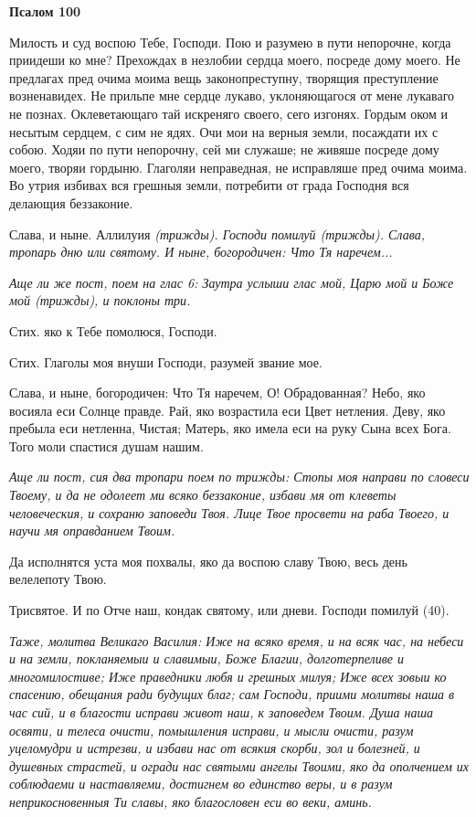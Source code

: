 \bfseries Псалом 100\normalfont{}


Милость и суд воспою Тебе, Господи. Пою и разумею в пути непорочне, когда приидеши ко мне? Прехождах в незлобии сердца моего, посреде дому моего. Не предлагах пред очима моима вещь законопреступну, творящия преступление возненавидех. Не прильпе мне сердце лукаво, уклоняющагося от мене лукаваго не познах. Оклеветающаго тай искреняго своего, сего изгонях. Гордым оком и несытым сердцем, с сим не ядях. Очи мои на верныя земли, посаждати их с собою. Ходяи по пути непорочну, сей ми служаше; не живяше посреде дому моего, творяи гордыню. Глаголяи неправедная, не исправляше пред очима моима. Во утрия избивах вся грешныя земли, потребити от града Господня вся делающия беззаконие.


Слава, и ныне. Аллилуия \itshape (трижды)\normalfont{}. Господи помилуй \itshape (трижды)\normalfont{}. Слава, тропарь дню или святому. И ныне, богородичен: Что Тя наречем...


\itshape Аще ли же пост, поем на глас 6:\normalfont{} Заутра услыши глас мой, Царю мой и Боже мой \itshape (трижды)\normalfont{}, и поклоны три.


Стих. яко к Тебе помолюся, Господи.


Стих. Глаголы моя внуши Господи, разумей звание мое.


Слава, и ныне, богородичен: Что Тя наречем, О! Обрадованная? Небо, яко восияла еси Солнце правде. Рай, яко возрастила еси Цвет нетления. Деву, яко пребыла еси нетленна, Чистая; Матерь, яко имела еси на руку Сына всех Бога. Того моли спастися душам нашим.


\itshape Аще ли пост, сия два тропари поем по трижды:\normalfont{} Стопы моя направи по словеси Твоему, и да не одолеет ми всяко беззаконие, избави мя от клеветы человеческия, и сохраню заповеди Твоя. Лице Твое просвети на раба Твоего, и научи мя оправданием Твоим.


Да исполнятся уста моя похвалы, яко да воспою славу Твою, весь день велелепоту Твою.


Трисвятое. И по Отче наш, кондак святому, или дневи. Господи помилуй (40).


\itshape Таже, молитва Великаго Василия:\normalfont{} Иже на всяко время, и на всяк час, на небеси и на земли, покланяемыи и славимыи, Боже Благии, долготерпеливе и многомилостиве; Иже праведники любя и грешных милуя; Иже всех зовыи ко спасению, обещания ради будущих благ; сам Господи, приими молитвы наша в час сий, и в благости исправи живот наш, к заповедем Твоим. Душа наша освяти, и телеса очисти, помышления исправи, и мысли очисти, разум уцеломудри и истрезви, и избави нас от всякия скорби, зол и болезней, и душевных страстей, и огради нас святыми ангелы Твоими, яко да ополчением их соблюдаеми и наставляеми, достигнем во единство веры, и в разум неприкосновенныя Ти славы, яко благословен еси во веки, аминь.


